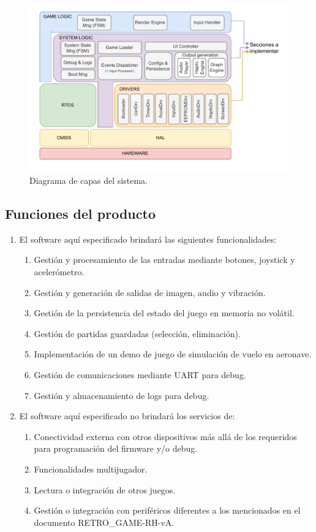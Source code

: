 \documentclass[11pt,a4paper]{article}
\begin{document}
\begin{figure}[htpb]
\centering 
\includegraphics[width=.85\textwidth]{../Figuras/SW_layers.pdf}
\caption{Diagrama de capas del sistema.}
\label{fig:diagCapas}
\end{figure}


\subsection{Funciones del producto}
\label{sec:orgaf51da6}

\begin{enumerate}
  \item El software aquí especificado brindará las siguientes funcionalidades:
  \begin{enumerate}
    \item Gestión y procesamiento de las entradas mediante botones, joystick y acelerómetro.
    \item Gestión y generación de salidas de imagen, audio y vibración.
    \item Gestión de la persistencia del estado del juego en memoria no volátil.
    \item Gestión de partidas guardadas (selección, eliminación).
    \item Implementación de un demo de juego de simulación de vuelo en aeronave.
    \item Gestión de comunicaciones mediante UART para debug.
    \item Gestión y almacenamiento de logs para debug.
  \end{enumerate}
  \item El software aquí especificado no brindará los servicios de:
  \begin{enumerate}
    \item Conectividad externa con otros dispositivos más allá de los requeridos para programación del firmware y/o debug.
    \item Funcionalidades multijugador.
    \item Lectura o integración de otros juegos.
    \item Gestión o integración con periféricos diferentes a los mencionados en el documento RETRO\_GAME-RH-vA.
  \end{enumerate}
\end{enumerate}
\end{document}

